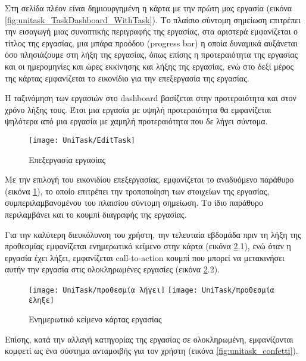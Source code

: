         Στη σελίδα πλέον είναι δημιουργημένη η κάρτα με την πρώτη μας εργασία (εικόνα \ref{fig:unitask_TaskDashboard_WithTask}). Το πλαίσιο {\Zona σύντομη σημείωση} επιτρέπει την εισαγωγή μιας συνοπτικής περιγραφής της εργασίας, στα αριστερά εμφανίζεται ο τίτλος της εργασίας, μια μπάρα προόδου (progress bar) η οποία δυναμικά αυξάνεται όσο πλησιάζουμε στη λήξη της εργασίας, όπως επίσης η προτεραιότητα της εργασίας και οι ημερομηνίες και ώρες εκκίνησης και λήξης της εργασίας, ενώ στο δεξί μέρος της κάρτας εμφανίζεται το εικονίδιο για την επεξεργασία της εργασίας.

        Η ταξινόμηση των εργασιών στο dashboard βασίζεται στην προτεραιότητα και στον χρόνο λήξης τους. Έτσι μια εργασία με υψηλή προτεραιότητα θα εμφανίζεται ψηλότερα από μια εργασία με χαμηλή προτεραιότητα που δε λήγει σύντομα.

        \begin{figure}[h!] \noindent \centering
            \texttt{[image: UniTask/EditTask]}
            \caption{\centering Επεξεργασία εργασίας}
            \label{fig:unitask_EditTask}
        \end{figure}

        Με την επιλογή του εικονιδίου επεξεργασίας, εμφανίζεται το αναδυόμενο παράθυρο (εικόνα \ref{fig:unitask_EditTask}), το οποίο επιτρέπει την τροποποίηση των στοιχείων της εργασίας, συμπεριλαμβανομένου του πλαισίου {\Zona σύντομη σημείωση}. Το ίδιο παράθυρο περιλαμβάνει και το κουμπί διαγραφής της εργασίας.

        Για την καλύτερη διευκόλυνση του χρήστη, την τελευταία εβδομάδα πριν τη λήξη της προθεσμίας εμφανίζεται ενημερωτικό κείμενο στην κάρτα (εικόνα \ref{fig:unitask_cardInfo}.1), ενώ όταν η εργασία έχει λήξει, εμφανίζεται call-to-action κουμπί που μπορεί να μετακινήσει αυτήν την εργασία στις ολοκληρωμένες εργασίες (εικόνα \ref{fig:unitask_cardInfo}.2).

        \begin{figure}[h!] \noindent \centering
            \texttt{[image: UniTask/προθεσμία λήγει]}
            \texttt{[image: UniTask/προθεσμία έληξε]}
            \caption{\centering Ενημερωτικό κείμενο κάρτας εργασίας}
            \label{fig:unitask_cardInfo}
        \end{figure}

        Επίσης, κατά την αλλαγή κατηγορίας της εργασίας σε ολοκληρωμένη, εμφανίζονται κομφετί ως ένα σύστημα ανταμοιβής για τον χρήστη (εικόνα \ref{fig:unitask_confetti}).

